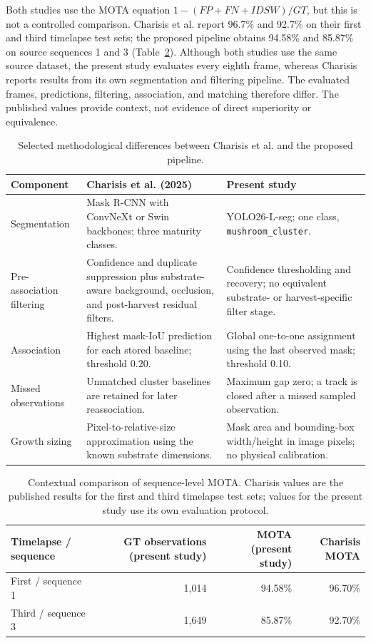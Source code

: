 \documentclass[11pt,a4paper]{article}
\begin{document}
Both studies use the MOTA equation $1-(FP+FN+IDSW)/GT$, but this is not a controlled comparison. Charisis et al. report 96.7\% and 92.7\% on their first and third timelapse test sets; the proposed pipeline obtains 94.58\% and 85.87\% on source sequences 1 and 3 (Table~\ref{tab:mota-charisis}). Although both studies use the same source dataset, the present study evaluates every eighth frame, whereas Charisis reports results from its own segmentation and filtering pipeline. The evaluated frames, predictions, filtering, association, and matching therefore differ. The published values provide context, not evidence of direct superiority or equivalence.

\begin{table}[H]
\centering\scriptsize
\caption{Selected methodological differences between Charisis et al. and the proposed pipeline.}
\label{tab:charisis-method-comparison}
\begin{tabularx}{\linewidth}{p{2.4cm}XX}
\toprule
Component & Charisis et al. (2025) & Present study \\
\midrule
Segmentation & Mask R-CNN with ConvNeXt or Swin backbones; three maturity classes. & YOLO26-L-seg; one class, \texttt{mushroom\_cluster}. \\
Pre-association filtering & Confidence and duplicate suppression plus substrate-aware background, occlusion, and post-harvest residual filters. & Confidence thresholding and recovery; no equivalent substrate- or harvest-specific filter stage. \\
Association & Highest mask-IoU prediction for each stored baseline; threshold 0.20. & Global one-to-one assignment using the last observed mask; threshold 0.10. \\
Missed observations & Unmatched cluster baselines are retained for later reassociation. & Maximum gap zero; a track is closed after a missed sampled observation. \\
Growth sizing & Pixel-to-relative-size approximation using the known substrate dimensions. & Mask area and bounding-box width/height in image pixels; no physical calibration. \\
\bottomrule
\end{tabularx}
\end{table}

\begin{table}[H]
\centering\small
\caption{Contextual comparison of sequence-level MOTA. Charisis values are the published results for the first and third timelapse test sets; values for the present study use its own evaluation protocol.}
\label{tab:mota-charisis}
\begin{tabular}{lrrr}
\toprule
Timelapse / sequence & GT observations (present study) & MOTA (present study) & Charisis MOTA \\
\midrule
First / sequence 1 & 1,014 & 94.58\% & 96.70\% \\
Third / sequence 3 & 1,649 & 85.87\% & 92.70\% \\
\bottomrule
\end{tabular}
\end{table}
\FloatBarrier
\end{document}
